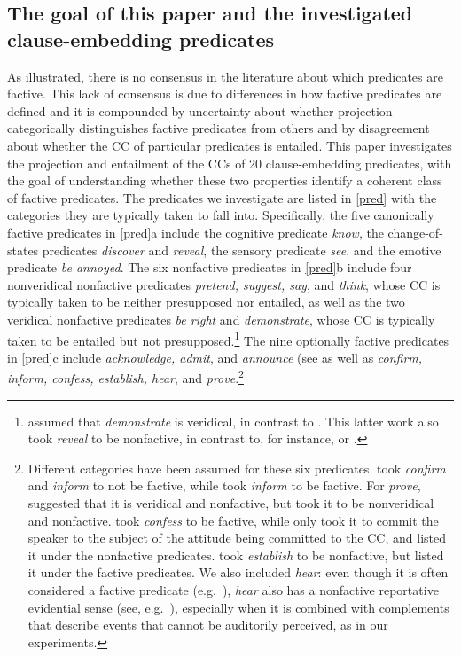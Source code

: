 \documentclass{language}
\newcommand{\6}{\mbox{$[\hspace*{-.6mm}[$}}
\newcommand{\9}{\mbox{$]\hspace*{-.6mm}]$}}
\begin{document}
\subsection{The goal of this paper and the investigated clause-embedding predicates}

As illustrated, there is no consensus in the literature about which predicates are factive. This lack of consensus is due to differences in how factive predicates are defined and it is compounded by uncertainty about whether projection categorically distinguishes factive predicates from others and by disagreement about whether the CC of particular predicates is entailed. This paper investigates the projection and entailment of the CCs of 20 clause-embedding predicates, with the goal of understanding whether these two properties identify a coherent class of factive predicates. The predicates we investigate are listed in \ref{pred} with the categories they are typically taken to fall into. Specifically, the five canonically factive predicates in \ref{pred}a include the cognitive predicate {\em know}, the change-of-states predicates {\em discover} and {\em reveal}, the sensory predicate {\em see}, and the emotive predicate {\em be annoyed}. The six nonfactive predicates in \ref{pred}b include four {\sc nonveridical nonfactive} predicates {\em pretend, suggest, say}, and {\em think}, whose CC is typically taken to be neither presupposed nor entailed, as well as  the two {\sc veridical nonfactive} predicates {\em be right} and {\em demonstrate}, whose CC is typically taken to be entailed but not presupposed.\footnote{\citealt{anand-hacquard2014} assumed that {\em demonstrate} is veridical, in contrast to \citealt{anand-etal2019}. This latter work also took {\em reveal} to be nonfactive, in contrast to, for instance, \citealt{egre2008,wyse} or \citealt{tbd-variability}.}  The nine optionally factive predicates in \ref{pred}c include {\em acknowledge, admit}, and {\em announce} (see \citealt{kiparsky-kiparsky70} as well as {\em confirm, inform, confess, establish, hear}, and {\em prove}.\footnote{Different categories have been assumed for these six predicates. \citet{anand-hacquard2014} took {\em confirm} and {\em inform}  to not be factive, while \citet{schlenker10} took {\em inform} to be factive. For {\em prove}, \citet{white-rawlins-nels2018} suggested that it is veridical and nonfactive, but \citet{anand-hacquard2014} took it to be nonveridical and nonfactive. \citet{swanson2012}  took {\em confess} to be factive, while \citet{karttunen2016} only took it to commit the speaker to the subject of the attitude being committed to the CC, and \citet{wyse} listed it under the nonfactive predicates. \citet{swanson2012} took  {\em establish} to be nonfactive, but \citet{wyse} listed it under the factive predicates. We also included {\em hear}: even though it is often considered a factive predicate (e.g.\ \citealt{beaver-belly,anand-hacquard2014}), {\em hear} also has a nonfactive reportative evidential sense (see, e.g.\ \citealt{anderson86,simons07}), especially when it is combined with complements that describe events that cannot be auditorily perceived, as in our experiments.}
\end{document}
